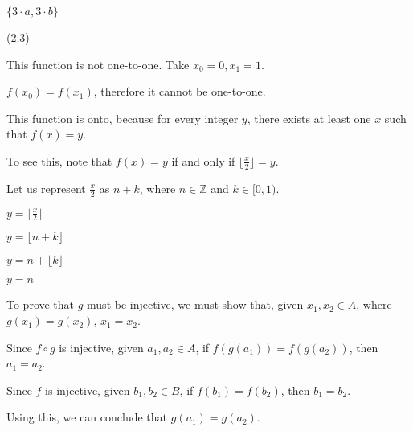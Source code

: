\documentclass{exam}
\begin{document}
\begin{questions}
\begin{subparts}

\begin{center}
\( \{3 \cdot a, 3 \cdot b\} \)
\end{center}

\end{subparts}

 (2.3)

\begin{center}

This function is not one-to-one. Take \(x_0 = 0, x_1 = 1\). 

\(f(x_0) = f(x_1)\), therefore it cannot be one-to-one.
\vspace{5px}

This function is onto, because for every integer \(y\), there exists at least one \(x\) such that \(f(x) = y\). 

To see this, note that \(f(x) = y\) if and only if \(\lfloor \frac{x}{2} \rfloor = y\).

Let us represent \(\frac{x}{2}\) as \(n + k\), where \(n \in \mathbb{Z}\) and \(k \in [0,1)\). 

\( y = \lfloor \frac{x}{2} \rfloor \)

\( y = \lfloor n + k \rfloor \)

\( y = n + \lfloor k \rfloor \)

\( y = n \)

\end{center}

\newpage

\begin{subparts}

\begin{center}

To prove that \(g\) must be injective, we must show that, given \(x_1, x_2 \in A\), where \(g(x_1) = g(x_2)\), \(x_1 = x_2\).

Since \(f \circ g\) is injective, given \(a_1, a_2 \in A\), if \(f(g(a_1)) = f(g(a_2))\), then \(a_1 = a_2\).

Since \(f\) is injective, given \(b_1, b_2 \in B\), if \(f(b_1) = f(b_2)\), then \(b_1 = b_2\).

Using this, we can conclude that \(g(a_1) = g(a_2)\).


\end{center}
\end{subparts}
\end{questions}
\end{document}
